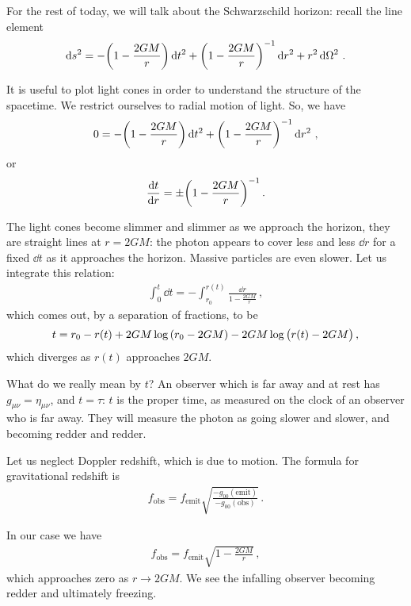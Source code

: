 \documentclass[main.tex]{subfiles}
\begin{document}
For the rest of today, we will talk about the Schwarzschild horizon: recall the line element 
%
\begin{align}
  \dd{s^2} = - \qty(1- \frac{2GM}{r}) \dd{t^2}
  + \qty(1 - \frac{2GM}{r})^{-1} \dd{r^2} 
  + r^2 \dd{\Omega^2}
\,.
\end{align}
%

It is useful to plot light cones in order to understand the structure of the spacetime. 
We restrict ourselves to radial motion of light. So, we have 
%
\begin{align}
  0 = - \qty(1- \frac{2GM}{r}) \dd{t^2}
  + \qty(1 - \frac{2GM}{r})^{-1} \dd{r^2} 
\,,
\end{align}
%
or 
%
\begin{align}
  \dv{t}{r} = \pm \qty(1 - \frac{2GM}{r})^{-1}
\,.
\end{align}
%

The light cones become slimmer and slimmer as we approach the horizon, they are straight lines at \(r = 2GM\): the photon appears to cover less and less \(\dd{r}\) for a fixed \(\dd{t}\) as it approaches the horizon. 
Massive particles are even slower. 
Let us integrate this relation: 
%
\begin{align}
  \int_0^t \dd{t} = - \int_{r_0}^{r(t)} \frac{\dd{r}}{1 - \frac{2GM}{r}} 
\,,
\end{align}
%
which comes out, by a separation of fractions, to be 
%
\begin{align}
  t = r_0 - r(t) + 2GM \log \qty(r_0 - 2GM) - 2GM \log \qty(r(t) - 2GM)
\,,
\end{align}
%
which diverges as \(r(t)\) approaches \(2GM\). 

What do we really mean by \(t\)? 
An observer which is far away and at rest has \(g_{\mu \nu } = \eta_{\mu \nu }\), and \(t = \tau \): \(t\) is the proper time, as measured on the clock of an observer who is far away. 
They will measure the photon as going slower and slower, and becoming redder and redder. 

Let us neglect Doppler redshift, which is due to motion. 
The formula for gravitational redshift is 
%
\begin{align}
  f _{\text{obs}} = f _{\text{emit}} \sqrt{\frac{- g_{00} (\text{emit})}{-g_{00} (\text{obs})}}
\,.
\end{align}
%

In our case we have 
%
\begin{align}
  f _{\text{obs}} = f _{\text{emit}} \sqrt{1 - \frac{2GM}{r}}
\,,
\end{align}
%
which approaches zero as \(r \rightarrow 2GM\). 
We see the infalling observer becoming redder and ultimately freezing. 
\end{document}
